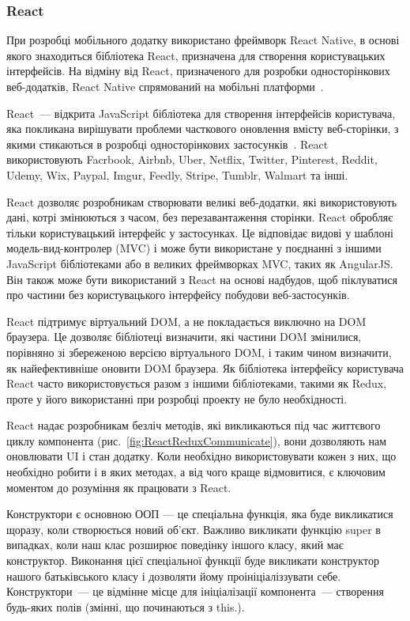 \subsubsection{React} \label{subs:React}


При розробці мобільного додатку використано фреймворк React Native, в основі якого знаходиться бібліотека React, призначена для створення користувацьких інтерфейсів. На відміну від React, призначеного для розробки односторінкових веб-додатків, React Native спрямований на мобільні платформи~\cite{davidgeary2019}.

React~--- відкрита JavaScript бібліотека для створення інтерфейсів користувача, яка покликана вирішувати проблеми часткового оновлення вмісту веб-сторінки, з якими стикаються в розробці односторінкових застосунків~\cite{ericmasiello2017}. React використовують Facrbook, Airbnb, Uber, Netflix, Twitter, Pinterest, Reddit, Udemy, Wix, Paypal, Imgur, Feedly, Stripe, Tumblr, Walmart та інші.

React дозволяє розробникам створювати великі веб-додатки, які використовують дані, котрі змінюються з часом, без перезавантаження сторінки. React обробляє тільки користувацький інтерфейс у застосунках. Це відповідає видові у шаблоні модель-вид-контролер (MVC) і може бути використане у поєднанні з іншими JavaScript бібліотеками або в великих фреймворках MVC, таких як AngularJS. Він також може бути використаний з React на основі надбудов, щоб піклуватися про частини без користувацького інтерфейсу побудови веб-застосунків.

React підтримує віртуальний DOM, а не покладається виключно на DOM браузера. Це дозволяє бібліотеці визначити, які частини DOM змінилися, порівняно зі збереженою версією віртуального DOM, і таким чином визначити, як найефективніше оновити DOM браузера. Як бібліотека інтерфейсу користувача React часто використовується разом з іншими бібліотеками, такими як Redux, проте у його використанні при розробці проекту не було необхідності.

React надає розробникам безліч методів, які викликаються під час життєвого циклу компонента (рис.~\ref{fig:ReactReduxCommunicate}), вони дозволяють нам оновлювати UI і стан додатку. Коли необхідно використовувати кожен з них, що необхідно робити і в яких методах, а від чого краще відмовитися, є ключовим моментом до розуміння як працювати з React.


Конструктори є основною ООП — це спеціальна функція, яка буде викликатися щоразу, коли створюється новий об'єкт. Важливо викликати функцію super в випадках, коли наш клас розширює поведінку іншого класу, який має конструктор. Виконання цієї спеціальної функції буде викликати конструктор нашого батьківського класу і дозволяти йому проініціаліззувати себе. 
Конструктори~--- це відмінне місце для ініціалізації компонента~--- створення будь-яких полів (змінні, що починаються з this.).

